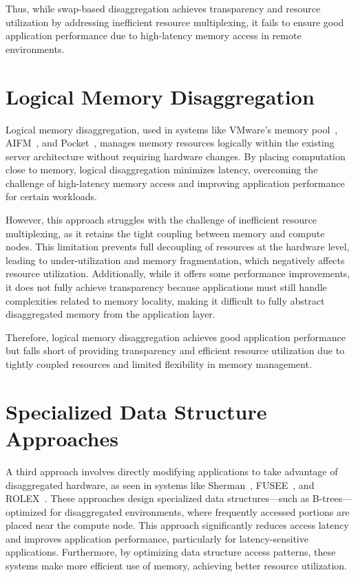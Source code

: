 Thus, while swap-based disaggregation achieves transparency and resource utilization by addressing inefficient resource multiplexing, it fails to ensure good application performance due to high-latency memory access in remote environments.

\section{Logical Memory Disaggregation}

Logical memory disaggregation, used in systems like VMware’s memory pool~\cite{pool1}, AIFM~\cite{aifm}, and Pocket~\cite{pocket}, manages memory resources logically within the existing server architecture without requiring hardware changes. By placing computation close to memory, logical disaggregation minimizes latency, overcoming the challenge of high-latency memory access and improving application performance for certain workloads.

However, this approach struggles with the challenge of inefficient resource multiplexing, as it retains the tight coupling between memory and compute nodes. This limitation prevents full decoupling of resources at the hardware level, leading to under-utilization and memory fragmentation, which negatively affects resource utilization. Additionally, while it offers some performance improvements, it does not fully achieve transparency because applications must still handle complexities related to memory locality, making it difficult to fully abstract disaggregated memory from the application layer.

Therefore, logical memory disaggregation achieves good application performance but falls short of providing transparency and efficient resource utilization due to tightly coupled resources and limited flexibility in memory management.

\section{Specialized Data Structure Approaches}

A third approach involves directly modifying applications to take advantage of disaggregated hardware, as seen in systems like Sherman~\cite{sherman}, FUSEE~\cite{fusee}, and ROLEX~\cite{rolex}. These approaches design specialized data structures—such as B-trees—optimized for disaggregated environments, where frequently accessed portions are placed near the compute node. This approach significantly reduces access latency and improves application performance, particularly for latency-sensitive applications. Furthermore, by optimizing data structure access patterns, these systems make more efficient use of memory, achieving better resource utilization.

